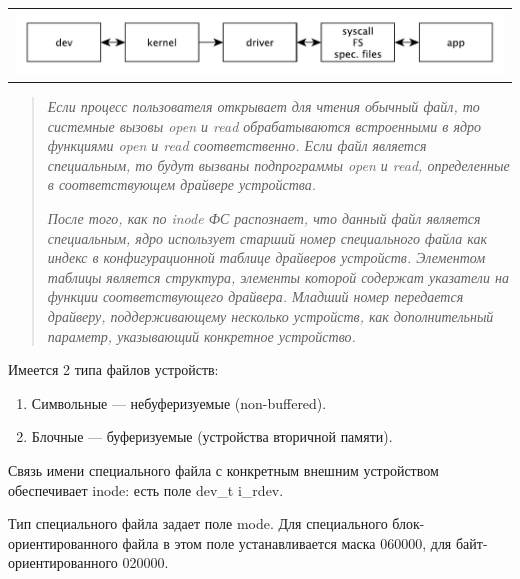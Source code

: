 \begin{table}[h!]
  \centering
  \begin{tabular}{p{1\linewidth}}
    \centering
    \includegraphics[width=1\linewidth]{./images/spec_files.pdf}
  \end{tabular}
\end{table}

\begin{quote}
\textit{Если процесс пользователя открывает для чтения обычный файл, то системные вызовы open и read обрабатываются встроенными в ядро функциями open и read соответственно. Если файл является специальным, то будут вызваны подпрограммы open и read, определенные в соответствующем драйвере устройства.}

\textit{После того, как по inode ФС распознает, что данный файл является специальным, ядро использует старший номер специального файла как индекс в конфигурационной таблице драйверов устройств. Элементом таблицы является структура, элементы которой содержат указатели на функции соответствующего драйвера. Младший номер передается драйверу, поддерживающему несколько устройств, как дополнительный параметр, указывающий конкретное устройство.}
\end{quote}

Имеется 2 типа файлов устройств:
\begin{enumerate}
	\item Символьные --- небуферизуемые (non-buffered).
	\item Блочные --- буферизуемые (устройства вторичной памяти).
\end{enumerate}

Связь имени специального файла с конкретным внешним устройством обеспечивает inode: есть поле dev\_t i\_rdev.

Тип специального файла задает поле mode. Для специального блок-ориентированного файла в этом поле устанавливается маска 060000, для байт- ориентированного 020000.

